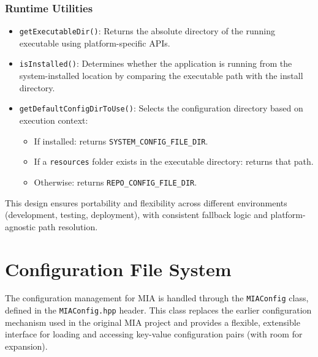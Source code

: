 \subsubsection*{Runtime Utilities}
\begin{itemize}
	\item \texttt{getExecutableDir()}: Returns the absolute directory of the running executable using platform-specific APIs.
	
	\item \texttt{isInstalled()}: Determines whether the application is running from the system-installed location by comparing the executable path with the install directory.
	
	\item \texttt{getDefaultConfigDirToUse()}: Selects the configuration directory based on execution context:
	\begin{itemize}
		\item If installed: returns \texttt{SYSTEM\_CONFIG\_FILE\_DIR}.
		\item If a \texttt{resources} folder exists in the executable directory: returns that path.
		\item Otherwise: returns \texttt{REPO\_CONFIG\_FILE\_DIR}.
	\end{itemize}
\end{itemize}

This design ensures portability and flexibility across different environments (development, testing, deployment), with consistent fallback logic and platform-agnostic path resolution.





















\section{Configuration File System}

The configuration management for MIA is handled through the \texttt{MIAConfig} class, defined in the \texttt{MIAConfig.hpp} header. This class replaces the earlier configuration mechanism used in the original MIA project and provides a flexible, extensible interface for loading and accessing key-value configuration pairs (with room for expansion).


